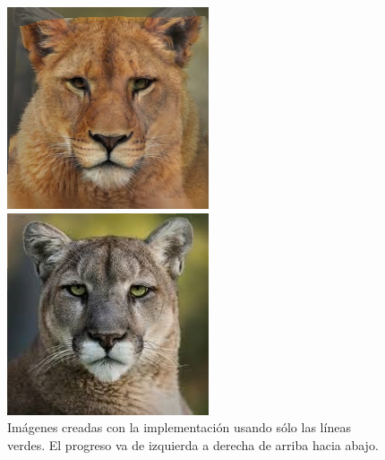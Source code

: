 \documentclass[conference]{IEEEtran}
\begin{document}
\begin{figure}[H]
\begin{multicols}{3}
    \includegraphics[width=1.0\linewidth]{results/cats/G/img20.png} \par
    \includegraphics[width=1.0\linewidth]{results/cats/G/img50.png} \par
\end{multicols}
\caption{Imágenes creadas con la implementación usando sólo las líneas verdes. El progreso va de izquierda a derecha de arriba hacia abajo.}
\end{figure}
\end{document}
